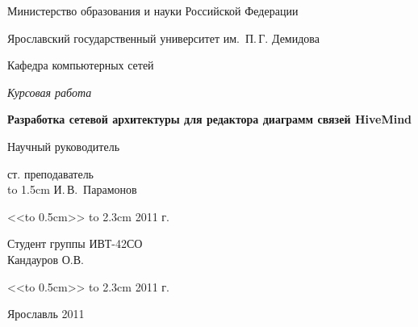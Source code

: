 \thispagestyle{empty}

\enlargethispage{2cm}
{
\begin{center}
\renewcommand{\baselinestretch}{1.25}
{
\selectfont
Министерство образования и науки Российской Федерации

Ярославский государственный университет им.~П.\,Г. Демидова

Кафедра компьютерных сетей

\vspace{6cm}

{\em Курсовая работа}


\vspace{0.5cm}

{ \Large \bf Разработка сетевой архитектуры для редактора диаграмм связей
HiveMind}

\vspace{3cm}

\hfill\parbox{7cm}
{ 
Научный руководитель

ст. преподаватель\\
\hbox to 1.5cm{\hrulefill} И.\,В.~Парамонов

<<\hbox to 0.5cm{\hrulefill}>> \hbox to 2.3cm{\hrulefill} 2011 г.
}

\vspace{1.5cm}

\hfill\parbox{7cm}
{ 
Студент группы ИВТ-42СО\\
Кандауров О.В.

<<\hbox to 0.5cm{\hrulefill}>> \hbox to 2.3cm{\hrulefill} 2011 г.
}

\vspace{5cm}

Ярославль 2011
}
\end{center}
}

\newpage